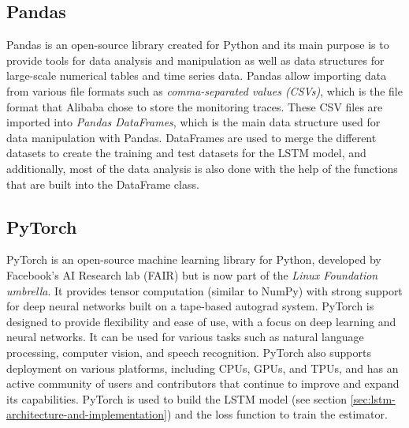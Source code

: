   \subsection{Pandas}
  \label{sec:pandas-third-party}

    Pandas \cite{pandasinc.PandasDocumentationPandas} is an open-source library created for Python and its main purpose is to provide tools for data analysis and manipulation as well as data structures for large-scale numerical tables and time series data.
    Pandas allow importing data from various file formats such as \emph{comma-separated values (CSVs)}, which is the file format that Alibaba chose to store the monitoring traces.
    These CSV files are imported into \emph{Pandas DataFrames}, which is the main data structure used for data manipulation with Pandas. DataFrames are used to merge the different datasets to create the training and test datasets for the LSTM model, and additionally, most of the data analysis is also done with the help of the functions that are built into the DataFrame class.

  \subsection{PyTorch}
  \label{sec:pytorch-third-party}
    PyTorch \cite{thelinuxfoundationPyTorch} is an open-source machine learning library for Python, developed by Facebook's AI Research lab (FAIR) but is now part of the \emph{Linux Foundation umbrella}. It provides tensor computation (similar to NumPy) with strong support for deep neural networks built on a tape-based autograd system. PyTorch is designed to provide flexibility and ease of use, with a focus on deep learning and neural networks. It can be used for various tasks such as natural language processing, computer vision, and speech recognition.
    PyTorch also supports deployment on various platforms, including CPUs, GPUs, and TPUs, and has an active community of users and contributors that continue to improve and expand its capabilities.
    PyTorch is used to build the LSTM model (see section \ref{sec:lstm-architecture-and-implementation}) and the loss function to train the estimator.
  




